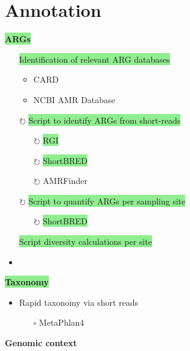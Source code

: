 \documentclass[11pt]{article}
\newcommand{\done}{\checkmark}  %
\newcommand{\pending}{$\square$}  %
\newcommand{\refine}{$\circlearrowright$}  %
\newcommand{\highlightessential}[1]{\colorbox{lightgreen}{#1}}  %
\newcommand{\highlightoptional}[1]{\colorbox{lightorange}{#1}}  %
\begin{document}
\section{Annotation}
\par\noindent\hspace{1cm}\highlightessential{\textbf{\large ARGs}}  %
	\begin{itemize}
		\item [\done] \highlightessential{Identification of relevant ARG databases}
			\begin{itemize}
				\item CARD
				\item NCBI AMR Database
			\end{itemize}
		\item [\refine]\highlightessential{Script to identify ARGs from short-reads}
			\begin{itemize}
				\item [\refine] \highlightessential{RGI}
				\item [\refine] \highlightessential{ShortBRED}
				\item [\refine] \highlightoptional{AMRFinder}
			\end{itemize}
		\item [\refine] \highlightessential{Script to quantify ARGs per sampling site}
			\begin{itemize}
				\item [\refine] \highlightessential{ShortBRED}
			\end{itemize}
		\item [\done] \highlightessential{Script diversity calculations per site}
		\item 
	\end{itemize}
\par\noindent\hspace{1cm}\highlightessential{\textbf{\large Taxonomy}}  %
	\begin{itemize}
		\item Rapid taxonomy via short reads
			\begin{itemize}
				\item [\pending] \highlightoptional{MetaPhlan4}
				
			\end{itemize}
	\end{itemize}
\par\noindent\hspace{1cm}\highlightoptional{\textbf{\large Genomic context}}  %
\end{document}
